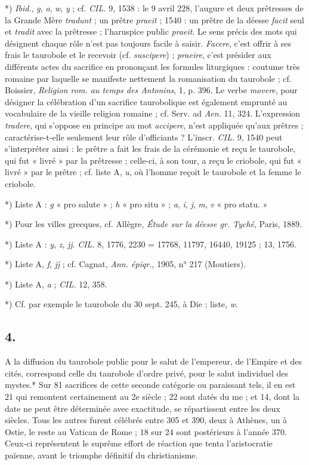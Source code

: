 \documentclass[a4paper, 11pt, oneside, polutonikogreek, french]{article}
\begin{document}
*) \emph{Ibid.}, \emph{g}, \emph{o}, \emph{w}, \emph{y} ; cf. \emph{CIL.} 9, 1538 : le 9 avril 228, l'augure et deux prêtresses de la Grande Mère \emph{tradunt} ; un prêtre \emph{praeit} ; 1540 : un prêtre de la déesse \emph{facit} seul et \emph{tradit} avec la prêtresse ; l'haruspice public \emph{praeit}. Le sens précis des mots qui désignent chaque rôle n'est pas toujours facile à saisir. \emph{Facere}, c'est offrir à ses frais le taurobole et le recevoir (cf. \emph{suscipere}) ; \emph{praeire}, c'est présider aux différents actes du sacrifice en prononçant les formules liturgiques : coutume très romaine par laquelle se manifeste nettement la romanisation du taurobole ; cf. Boissier, \emph{Religion rom. au temps des Antonins}, 1, p. 396. Le verbe \emph{movere}, pour désigner la célébration d'un sacrifice taurobolique est également emprunté au vocabulaire de la vieille religion romaine ; cf. Serv. ad \emph{Aen.} 11, 324. L'expression \emph{tradere}, qui s'oppose en principe au mot \emph{accipere}, n'est appliquée qu'aux prêtres ; caractérise-t-elle seulement leur rôle d'officiants ? L'inscr. \emph{CIL.} 9, 1540 peut s'interpréter ainsi : le prêtre a fait les frais de la cérémonie et reçu le taurobole, qui fut « livré » par la prêtresse ; celle-ci, à son tour, a reçu le criobole, qui fut « livré » par le prêtre ; cf. liste A, \emph{u}, où l'homme reçoit le taurobole et la femme le criobole.

*) Liste A : \emph{g} « pro salute » ; \emph{h} « pro situ » ; \emph{a}, \emph{i}, \emph{j}, \emph{m}, \emph{v} « pro statu. »

*) Pour les villes grecques, cf. Allègre, \emph{Étude sur la déesse gr. Tyché}, Paris, 1889.

*) Liste A : \emph{y}, \emph{z}, \emph{jj}. \emph{CIL.} 8, 1776, 2230 = 17768, 11797, 16440, 19125 ; 13, 1756.

*) Liste A, \emph{f}, \emph{jj} ; cf. Cagnat, \emph{Ann. épiqr.}, 1905, n° 217 (Moutiers).

*) Liste A, \emph{a} ; \emph{CIL.} 12, 358.

*) Cf. par exemple le taurobole du 30 sept. 245, à Die ; liste, \emph{w}.

\subsection{4.}

A la diffusion du taurobole public pour le salut de l'empereur, de l'Empire et des cités, correspond celle du taurobole d'ordre privé, pour le salut individuel des mystes.* Sur 81 sacrifices de cette seconde catégorie ou paraissant tels, il en est 21 qui remontent certainement au 2e siècle ; 22 sont datés du me ; et 14, dont la date ne peut être déterminée avec exactitude, se répartissent entre les deux siècles. Tous les autres furent célébrés entre 305 et 390, deux à Athènes, un à Ostie, le reste au Vatican de Rome ; 18 sur 24 sont postérieurs à l'année 370. Ceux-ci représentent le suprême effort de réaction que tenta l'aristocratie païenne, avant le triomphe définitif du christianisme.
\end{document}

